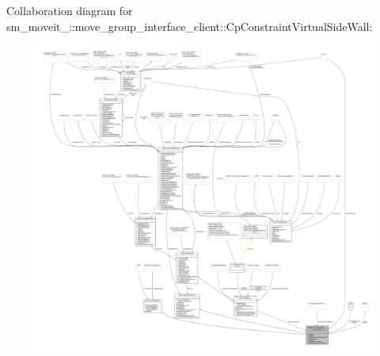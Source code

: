 Collaboration diagram for sm\+\_\+moveit\+\_\+:\+:move\+\_\+group\+\_\+interface\+\_\+client\+:\+:Cp\+Constraint\+Virtual\+Side\+Wall\+:
\nopagebreak
\begin{figure}[H]
\begin{center}
\leavevmode
\includegraphics[width=350pt]{classsm__moveit__4_1_1move__group__interface__client_1_1CpConstraintVirtualSideWall__coll__graph}
\end{center}
\end{figure}
